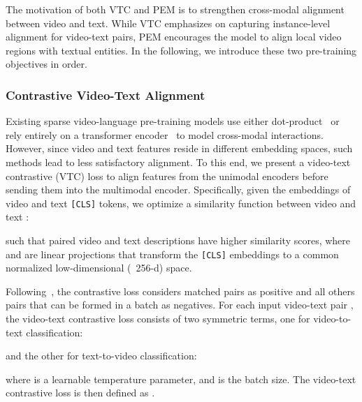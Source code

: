 \documentclass[10pt,twocolumn,letterpaper]{article}
\begin{document}
The motivation of both VTC and PEM is to strengthen cross-modal alignment between video and text. While VTC emphasizes on capturing instance-level alignment for video-text pairs, PEM encourages the model to align local video regions with textual entities.
In the following, we introduce these two pre-training objectives in order.
\vspace{-0.5em}
\subsubsection{Contrastive Video-Text Alignment}\label{sec:method-vtc}
Existing sparse video-language pre-training models use either dot-product~\cite{miech2019howto100m,miech2020end,xu2021videoclip,Bain21} or rely entirely on a transformer encoder~\cite{lei2021less,li2020hero,sun2019videobert,zhu2020actbert} to model cross-modal interactions.
However, since video and text features reside in different embedding spaces, such methods lead to less satisfactory alignment.
To this end, we present a video-text contrastive (VTC) loss to align features from the unimodal encoders before sending them into the multimodal encoder.
Specifically, given the embeddings of video and text \texttt{[CLS]} tokens, we optimize a similarity function between video  and text :

such that paired video and text descriptions have higher similarity scores, where  and  are linear projections that transform the \texttt{[CLS]} embeddings to a common normalized low-dimensional (\eg~256-d) space.



Following~\cite{radford2learning,align}, the contrastive loss considers matched pairs as positive and all others pairs that can be formed in a batch as negatives.
For each input video-text pair , the video-text contrastive loss consists of two symmetric terms, one for video-to-text classification:

and the other for text-to-video classification:

where  is a learnable temperature parameter, and  is the batch size. The video-text contrastive loss is then defined as .
\end{document}
